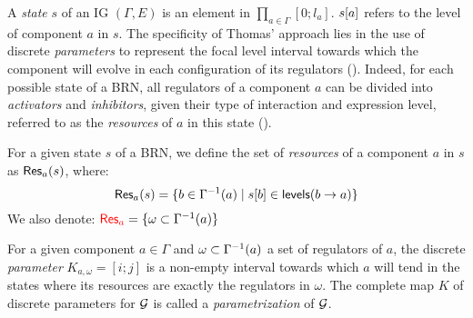 A \emph{state} $s$ of an IG $(\Gamma, E)$ is an element in $\prod_{a \in \Gamma} [0;l_a]$.
${s[a]}$ refers to the level of component $a$ in $s$.
The specificity of Thomas' approach lies in the use of discrete \emph{parameters} to represent the
focal level interval towards which the component will evolve in each configuration of its regulators
().
Indeed, for each possible state of a BRN, all regulators of a component $a$ can be divided into
\emph{activators} and \emph{inhibitors}, given their type of interaction and expression level,
referred to as the \emph{resources} of $a$ in this state ().


\begin{definition}\label{def:resources}
For a given state $s$ of a BRN, we define the set of \emph{resources} of a component $a$ in $s$ as $\mathsf{Res}_{a}(s)$, where:
$$\mathsf{Res}_{a}(s) = \{ b \in \Gamma^{-1}(a) \mid {s[b]} \in \mathsf{levels}(b\rightarrow a) \}$$
We also denote: $\textcolor{red}{\mathsf{Res}_{a}} = \{ \omega \subset \Gamma^{-1}(a) \}$
\end{definition}

\begin{definition}\label{def:param}
For a given component $a \in \Gamma$ and $\omega \subset \Gamma^{-1}(a)$ a set of regulators of $a$,
the discrete \emph{parameter} $K_{a,\omega} = [i; j]$ is a non-empty interval towards which $a$ will tend
in the states where its resources are exactly the regulators in $\omega$.
The complete map $K$ of discrete parameters for $\mathcal{G}$ is called a \emph{parametrization} of $\mathcal{G}$.
\end{definition}

